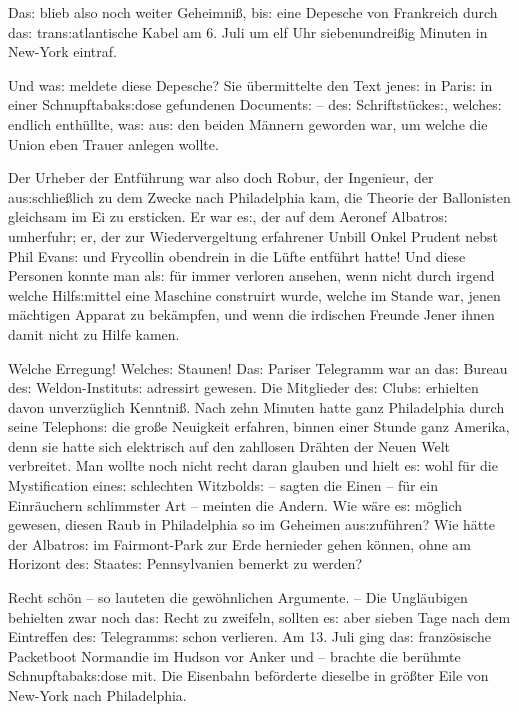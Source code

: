 \documentclass[oneside,12pt]{book}
\newcommand{\s}{s:}
\begin{document}
Da{\s} blieb also noch weiter Geheimni{\ss}, bi{\s} eine Depesche von
Frankreich durch da{\s} tran{\s}atlantische Kabel am 6. Juli um elf
Uhr siebenundrei{\ss}ig Minuten in New-York eintraf.

Und wa{\s} meldete diese Depesche? Sie \"ubermittelte den Text
jene{\s} in Pari{\s} in einer Schnupftabak{\s}dose gefundenen
Document{\s} -- de{\s} Schriftst\"ucke{\s}, welche{\s} endlich
enth\"ullte, wa{\s} au{\s} den beiden M\"annern geworden war, um
welche die Union eben Trauer anlegen wollte.

Der Urheber der Entf\"uhrung war also doch Robur, der Ingenieur, der
au{\s}schlie{\ss}lich zu dem Zwecke nach Philadelphia kam, die
Theorie der Ballonisten gleichsam im Ei zu ersticken. Er war e{\s},
der auf dem Aeronef {\glqq}Albatro{\s}{\grqq} umherfuhr; er, der zur
Wiedervergeltung erfahrener Unbill Onkel Prudent nebst Phil Evan{\s}
und Frycollin obendrein in die L\"ufte entf\"uhrt hatte! Und diese
Personen konnte man al{\s} f\"ur immer verloren ansehen, wenn nicht
durch irgend welche Hilf{\s}mittel eine Maschine construirt wurde,
welche im Stande war, jenen m\"achtigen Apparat zu bek\"ampfen, und
wenn die irdischen Freunde Jener ihnen damit nicht zu Hilfe kamen.

Welche Erregung! Welche{\s} Staunen! Da{\s} Pariser Telegramm war an
da{\s} Bureau de{\s} Weldon-Institut{\s} adressirt gewesen. Die
Mitglieder de{\s} Club{\s} erhielten davon unverz\"uglich
Kenntni{\ss}. Nach zehn Minuten hatte ganz Philadelphia durch seine
Telephon{\s} die gro{\ss}e Neuigkeit erfahren, binnen einer Stunde
ganz Amerika, denn sie hatte sich elektrisch auf den zahllosen
Dr\"ahten der Neuen Welt verbreitet. Man wollte noch nicht recht
daran glauben und hielt e{\s} wohl f\"ur die Mystification eine{\s}
schlechten Witzbold{\s} -- sagten die Einen -- f\"ur ein
{\glqq}Einr\"auchern{\grqq} schlimmster Art -- meinten die Andern.
Wie w\"are e{\s} m\"oglich gewesen, diesen Raub in Philadelphia so im
Geheimen au{\s}zuf\"uhren? Wie h\"atte der {\glqq}Albatro{\s}{\grqq}
im Fairmont-Park zur Erde hernieder gehen k\"onnen, ohne am Horizont
de{\s} Staate{\s} Pennsylvanien bemerkt zu werden?

Recht sch\"on -- so lauteten die gew\"ohnlichen Argumente. -- Die
Ungl\"aubigen behielten zwar noch da{\s} Recht zu zweifeln, sollten
e{\s} aber sieben Tage nach dem Eintreffen de{\s} Telegramm{\s} schon
verlieren. Am 13. Juli ging da{\s} franz\"osische Packetboot
{\glqq}Normandie{\grqq} im Hudson vor Anker und -- brachte die
ber\"uhmte Schnupftabak{\s}dose mit. Die Eisenbahn bef\"orderte
dieselbe in gr\"o{\ss}ter Eile von New-York nach Philadelphia.
\end{document}
